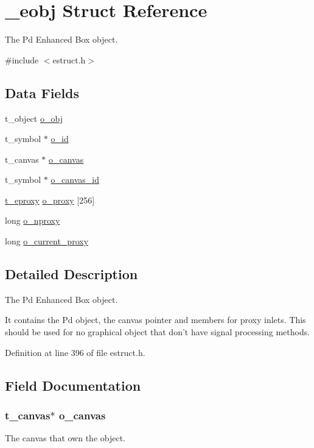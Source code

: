 \hypertarget{struct__eobj}{\section{\-\_\-eobj Struct Reference}
\label{struct__eobj}
}


The Pd Enhanced Box object.  




{\ttfamily \#include $<$estruct.\-h$>$}

\subsection*{Data Fields}
\begin{DoxyCompactItemize}
\item 
t\-\_\-object \hyperlink{struct__eobj_a8cffa8f3338cca7779ab922dab19227c}{o\-\_\-obj}
\item 
t\-\_\-symbol $\ast$ \hyperlink{struct__eobj_a024c5a2d6d2dcdf531f05a0e711cce68}{o\-\_\-id}
\item 
t\-\_\-canvas $\ast$ \hyperlink{struct__eobj_a4ac1a6544ba0591b83cbf38bc1349e74}{o\-\_\-canvas}
\item 
t\-\_\-symbol $\ast$ \hyperlink{struct__eobj_ab7f7ce6beaff87d1baca1a619b9a7ebf}{o\-\_\-canvas\-\_\-id}
\item 
\hyperlink{struct__eproxy}{t\-\_\-eproxy} \hyperlink{struct__eobj_a9435dcf0a1aed105a4c38d24dfc65dbf}{o\-\_\-proxy} \mbox{[}256\mbox{]}
\item 
long \hyperlink{struct__eobj_a5959b8f1e0726d2a7d82a4d39ae803bb}{o\-\_\-nproxy}
\item 
long \hyperlink{struct__eobj_a32a8921c66d63fcccc9df035f6b9160f}{o\-\_\-current\-\_\-proxy}
\end{DoxyCompactItemize}


\subsection{Detailed Description}
The Pd Enhanced Box object. 

It contains the Pd object, the canvas pointer and members for proxy inlets. This should be used for no graphical object that don't have signal processing methods. 

Definition at line 396 of file estruct.\-h.



\subsection{Field Documentation}
\hypertarget{struct__eobj_a4ac1a6544ba0591b83cbf38bc1349e74}{
\subsubsection[{o\-\_\-canvas}]{\setlength{\rightskip}{0pt plus 5cm}t\-\_\-canvas$\ast$ o\-\_\-canvas}}\label{struct__eobj_a4ac1a6544ba0591b83cbf38bc1349e74}
The canvas that own the object. 

